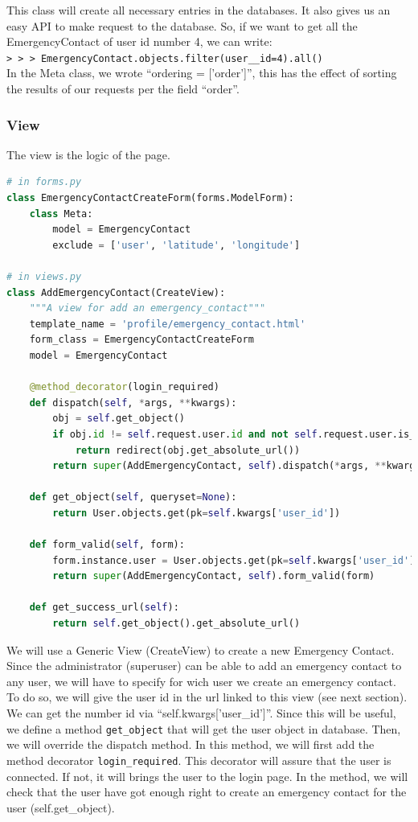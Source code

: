 \documentclass[11pt, a4paper]{article}      %
\newcommand{\pcmd}[1]{\\\indent\indent\texttt{\footnotesize> > > #1}\\}
\begin{document}
This class will create all necessary entries in the databases. It also gives us an easy API to make request to the database. So, if we want to get all the EmergencyContact of user id number 4, we can write:
\pcmd{EmergencyContact.objects.filter(user\_\_id=4).all()}

In the Meta class, we wrote ``ordering = ['order']'', this has the effect of sorting the results of our requests per the field ``order''.

\subsubsection{View}
The view is the logic of the page.

\begin{lstlisting}[language=Python, basicstyle=\footnotesize]
# in forms.py
class EmergencyContactCreateForm(forms.ModelForm):
    class Meta:
        model = EmergencyContact
        exclude = ['user', 'latitude', 'longitude']

# in views.py
class AddEmergencyContact(CreateView):
    """A view for add an emergency_contact"""
    template_name = 'profile/emergency_contact.html'
    form_class = EmergencyContactCreateForm
    model = EmergencyContact

    @method_decorator(login_required)
    def dispatch(self, *args, **kwargs):
        obj = self.get_object()
        if obj.id != self.request.user.id and not self.request.user.is_superuser:
            return redirect(obj.get_absolute_url())
        return super(AddEmergencyContact, self).dispatch(*args, **kwargs)

    def get_object(self, queryset=None):
        return User.objects.get(pk=self.kwargs['user_id'])

    def form_valid(self, form):
        form.instance.user = User.objects.get(pk=self.kwargs['user_id'])
        return super(AddEmergencyContact, self).form_valid(form)

    def get_success_url(self):
        return self.get_object().get_absolute_url()
\end{lstlisting}

We will use a Generic View (CreateView) to create a new Emergency Contact. Since the administrator (superuser) can be able to add an emergency contact to any user, we will have to specify for wich user we create an emergency contact. To do so, we will give the user id in the url linked to this view (see next section). We can get the number id via ``self.kwargs['user\_id']''. Since this will be useful, we define a method \texttt{get\_object} that will get the user object in database. Then, we will override the dispatch method. In this method, we will first add the method decorator \texttt{login\_required}. This decorator will assure that the user is connected. If not, it will brings the user to the login page. In the method, we will check that the user have got enough right to create an emergency contact for the user (self.get\_object). 
\end{document}
